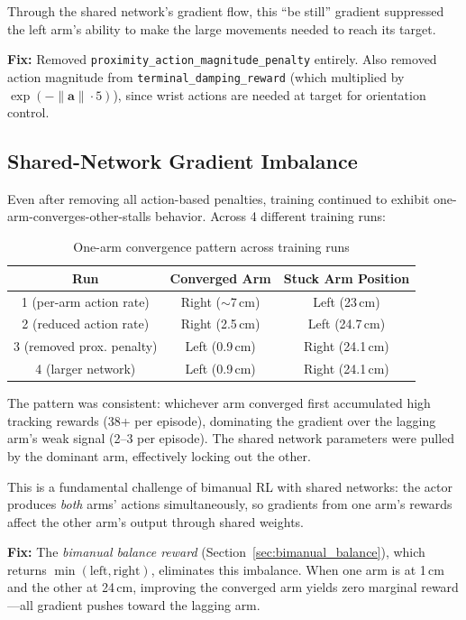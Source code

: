 \documentclass[11pt,a4paper]{article}
\begin{document}
Through the shared network's gradient flow, this ``be still'' gradient suppressed the left arm's ability to make the large movements needed to reach its target.

\textbf{Fix:} Removed \texttt{proximity\_action\_magnitude\_penalty} entirely. Also removed action magnitude from \texttt{terminal\_damping\_reward} (which multiplied by $\exp(-\|\mathbf{a}\| \cdot 5)$), since wrist actions are needed at target for orientation control.

\subsection{Shared-Network Gradient Imbalance}
\label{sec:gradient_imbalance}
Even after removing all action-based penalties, training continued to exhibit one-arm-converges-other-stalls behavior. Across 4 different training runs:

\begin{table}[H]
\centering
\caption{One-arm convergence pattern across training runs}
\begin{tabular}{@{}ccc@{}}
\toprule
\textbf{Run} & \textbf{Converged Arm} & \textbf{Stuck Arm Position} \\
\midrule
1 (per-arm action rate) & Right ($\sim$7\,cm) & Left (23\,cm) \\
2 (reduced action rate) & Right (2.5\,cm) & Left (24.7\,cm) \\
3 (removed prox. penalty) & Left (0.9\,cm) & Right (24.1\,cm) \\
4 (larger network) & Left (0.9\,cm) & Right (24.1\,cm) \\
\bottomrule
\end{tabular}
\end{table}

\noindent The pattern was consistent: whichever arm converged first accumulated high tracking rewards (38+ per episode), dominating the gradient over the lagging arm's weak signal (2--3 per episode). The shared network parameters were pulled by the dominant arm, effectively locking out the other.

This is a fundamental challenge of bimanual RL with shared networks: the actor produces \emph{both} arms' actions simultaneously, so gradients from one arm's rewards affect the other arm's output through shared weights.

\textbf{Fix:} The \emph{bimanual balance reward} (Section~\ref{sec:bimanual_balance}), which returns $\min(\text{left}, \text{right})$, eliminates this imbalance. When one arm is at 1\,cm and the other at 24\,cm, improving the converged arm yields zero marginal reward---all gradient pushes toward the lagging arm.
\end{document}
